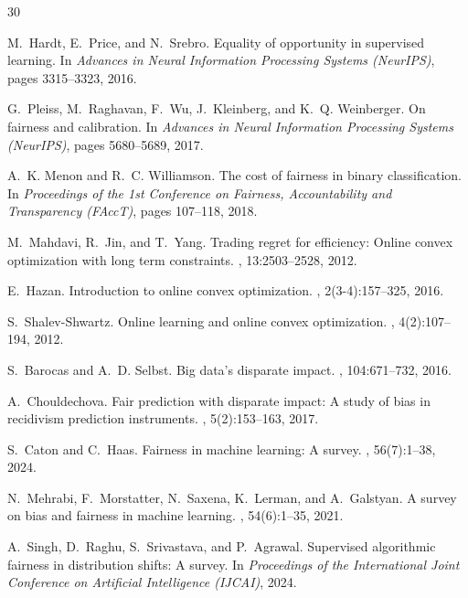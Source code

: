 \documentclass[10pt,twocolumn]{article}
\theoremstyle{definition}
\begin{document}
\begin{thebibliography}{30}

M.~Hardt, E.~Price, and N.~Srebro.
\newblock Equality of opportunity in supervised learning.
\newblock In {\em Advances in Neural Information Processing Systems (NeurIPS)}, pages 3315--3323, 2016.

G.~Pleiss, M.~Raghavan, F.~Wu, J.~Kleinberg, and K.~Q. Weinberger.
\newblock On fairness and calibration.
\newblock In {\em Advances in Neural Information Processing Systems (NeurIPS)}, pages 5680--5689, 2017.

A.~K. Menon and R.~C. Williamson.
\newblock The cost of fairness in binary classification.
\newblock In {\em Proceedings of the 1st Conference on Fairness, Accountability and Transparency (FAccT)}, pages 107--118, 2018.

M.~Mahdavi, R.~Jin, and T.~Yang.
\newblock Trading regret for efficiency: Online convex optimization with long term constraints.
, 13:2503--2528, 2012.

E.~Hazan.
\newblock Introduction to online convex optimization.
, 2(3-4):157--325, 2016.

S.~Shalev-Shwartz.
\newblock Online learning and online convex optimization.
, 4(2):107--194, 2012.

S.~Barocas and A.~D. Selbst.
\newblock Big data's disparate impact.
, 104:671--732, 2016.

A.~Chouldechova.
\newblock Fair prediction with disparate impact: A study of bias in recidivism prediction instruments.
, 5(2):153--163, 2017.

S.~Caton and C.~Haas.
\newblock Fairness in machine learning: A survey.
, 56(7):1--38, 2024.

N.~Mehrabi, F.~Morstatter, N.~Saxena, K.~Lerman, and A.~Galstyan.
\newblock A survey on bias and fairness in machine learning.
, 54(6):1--35, 2021.

A.~Singh, D.~Raghu, S.~Srivastava, and P.~Agrawal.
\newblock Supervised algorithmic fairness in distribution shifts: A survey.
\newblock In {\em Proceedings of the International Joint Conference on Artificial Intelligence (IJCAI)}, 2024.


\end{thebibliography}
\end{document}
